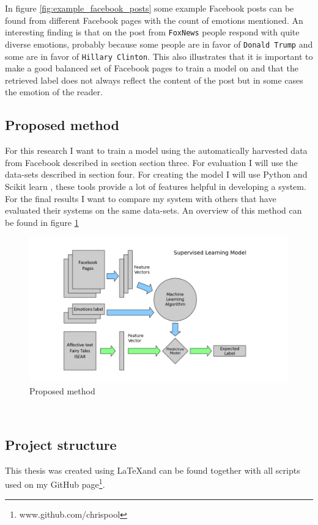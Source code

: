 \documentclass[
10pt, %
a4paper, %
oneside, %
headinclude,footinclude, %
BCOR5mm, %
]{scrartcl}
\begin{document}
In figure \ref{fig:example_facebook_posts} some example Facebook posts can be found from different Facebook pages with the count of emotions mentioned. An interesting finding is that on the post from \texttt{FoxNews} people respond with quite diverse emotions, probably because some people are in favor of \texttt{Donald Trump} and some are in favor of \texttt{Hillary Clinton}. This also illustrates that it is important to make a good balanced set of Facebook pages to train a model on and that the retrieved label does not always reflect the content of the post but in some cases the emotion of the reader.

\subsection{Proposed method}
For this research I want to train a model using the automatically harvested data from Facebook described in section section three. For evaluation I will use the data-sets described in section four. For creating the model I will use Python and Scikit learn \citep{scikit-learn}, these tools provide a lot of features helpful in developing a system. For the final results I want to compare my system with others that have evaluated their systems on the same data-sets. An overview of this method can be found in figure \ref{fig:proposed_method}
\begin{figure}[ht]
  \includegraphics[width=\linewidth]{supervised_learning.png}
  \caption{Proposed method \citep{astroMLText}}
  \label{fig:proposed_method}
\end{figure}\\

\subsection{Project structure}
This thesis was created using \LaTeX  and can be found together with all scripts used on my GitHub page\footnote{www.github.com/chrispool}.
\end{document}
